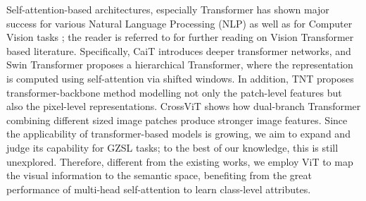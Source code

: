 \documentclass[a4paper,11pt]{article}
\newcommand{\anjan}[1]{\textcolor{red}{Anjan: #1}}
\newcommand{\myparagraph}[1]{\vspace{4pt}\noindent{\bf #1}}
\begin{document}



\myparagraph{Vision Transformer:} Self-attention-based architectures, especially Transformer \cite{Transfomer} has shown major success for various Natural Language Processing (NLP) \cite{NEURIPS2020_1457c0d6} as well as for Computer Vision tasks \cite{Alamri, ViT}; the reader is referred to \cite{khan2021transformers} for further reading on Vision Transformer based literature. Specifically, CaiT \cite{Deep_transfomer} introduces deeper transformer networks, and Swin Transformer \cite{Swin} proposes a hierarchical Transformer, where the representation is computed using self-attention via shifted windows. In addition, TNT \cite{TnT} proposes transformer-backbone method modelling not only the patch-level features but also the pixel-level representations. CrossViT \cite{CrossViT} shows how dual-branch Transformer combining different sized image patches produce stronger image features. Since the applicability of transformer-based models is growing, we aim to expand and judge its capability for GZSL tasks; to the best of our knowledge, this is still unexplored. Therefore, different from the existing works, we employ ViT to map the visual information to the semantic space, benefiting from the great performance of multi-head self-attention to learn class-level attributes. 

\end{document}
